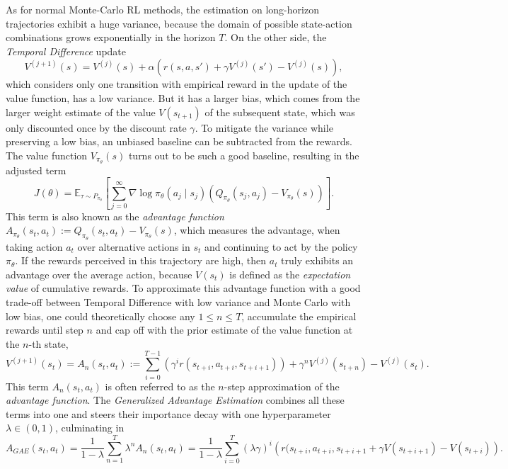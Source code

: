 \documentclass[a4paper, 11pt]{article}
\begin{document}
	As for normal Monte-Carlo RL methods, the estimation on long-horizon trajectories exhibit a huge variance, because the domain of possible state-action combinations grows exponentially in the horizon $T$.
	On the other side, the \textit{Temporal Difference} update 
	\[V^{(j+1)}(s)=V^{(j)}(s)+\alpha \left(r(s,a,s')+\gamma V^{(j)}(s')-V^{(j)}(s)\right),\]
	which considers only one transition with empirical reward in the update of the value function, has a low variance. But it has a larger bias, which comes from the larger weight estimate of the value $V(s_{t+1})$ of the subsequent state, which was only discounted once by the discount rate $\gamma$. 
	To mitigate the variance while preserving a low bias, an unbiased baseline can be subtracted from the rewards. The value function $V_{\pi_{\theta}}(s)$ turns out to be such a good baseline, resulting in the adjusted term 
	\[J(\theta)=\mathbb{E}_{\tau\sim P_{\pi_{\theta}}}\left[\sum_{j=0}^{\infty}\nabla\log\pi_\theta(a_j\mid s_j) \left(Q_{\pi_{\theta}}(s_j,a_j)-V_{\pi_{\theta}}(s)\right)\right].\]
	This term is also known as the \textit{advantage function} $A_{\pi_{\theta}}(s_t,a_t):=Q_{\pi_{\theta}}(s_t,a_t)-V_{\pi_{\theta}}(s)$, which measures the advantage, when taking action $a_t$ over alternative actions in $s_t$ and continuing to act by the policy $\pi_{\theta}$. If the rewards perceived in this trajectory are high, then $a_t$ truly exhibits an advantage over the average action, because $V(s_t)$ is defined as the \textit{expectation value} of cumulative rewards.
	To approximate this advantage function with a good trade-off between Temporal Difference with low variance and Monte Carlo with low bias, one could theoretically choose any $1\leq n \leq T$, accumulate the empirical rewards until step $n$ and cap off with the prior estimate of the value function at the $n$-th state,
	\[V^{(j+1)}(s_t)=A_n(s_t,a_t):=\sum_{i=0}^{T-1}\left(\gamma^i r(s_{t+i},a_{t+i},s_{t+i+1})\right) +\gamma^n V^{(j)}(s_{t+n})-V^{(j)}(s_t).\]
	This term $A_n(s_t,a_t)$ is often referred to as the $n$-step approximation of the \textit{advantage function}.
	The \textit{Generalized Advantage Estimation} combines all these terms into one and steers their importance decay with one hyperparameter $\lambda\in(0,1)$, culminating in
	\[A_{GAE}(s_t,a_t)=\frac{1}{1-\lambda}\sum_{n=1}^{T}\lambda^n A_n(s_t,a_t)=\frac{1}{1-\lambda}\sum_{i=0}^{T}(\lambda\gamma)^i\left( r(s_{t+i},a_{t+i},s_{t+i+1}+\gamma V(s_{t+i+1})-V(s_{t+i})\right).\]
	
\end{document}
